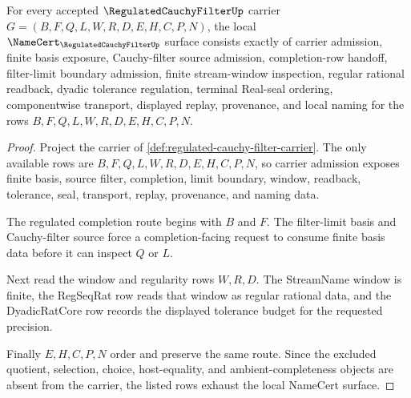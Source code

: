 \begin{theorem}
\label{thm:regulated-cauchy-filter-namecert-obligations}
For every accepted $\RegulatedCauchyFilterUp$ carrier $G=(B,F,Q,L,W,R,D,E,H,C,P,N)$, the local $\NameCert_{\RegulatedCauchyFilterUp}$ surface consists exactly of carrier admission, finite basis exposure, Cauchy-filter source admission, completion-row handoff, filter-limit boundary admission, finite stream-window inspection, regular rational readback, dyadic tolerance regulation, terminal Real-seal ordering, componentwise transport, displayed replay, provenance, and local naming for the rows $B,F,Q,L,W,R,D,E,H,C,P,N$.
\end{theorem}
\begin{proof}
Project the carrier of \autoref{def:regulated-cauchy-filter-carrier}. The only available rows are $B,F,Q,L,W,R,D,E,H,C,P,N$, so carrier admission exposes finite basis, source filter, completion, limit boundary, window, readback, tolerance, seal, transport, replay, provenance, and naming data.

The regulated completion route begins with $B$ and $F$. The filter-limit basis and Cauchy-filter source force a completion-facing request to consume finite basis data before it can inspect $Q$ or $L$.

Next read the window and regularity rows $W,R,D$. The StreamName window is finite, the RegSeqRat row reads that window as regular rational data, and the DyadicRatCore row records the displayed tolerance budget for the requested precision.

Finally $E,H,C,P,N$ order and preserve the same route. Since the excluded quotient, selection, choice, host-equality, and ambient-completeness objects are absent from the carrier, the listed rows exhaust the local NameCert surface.
\end{proof}

